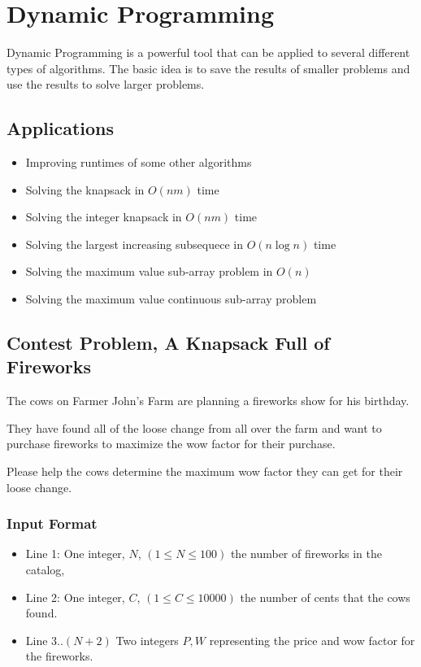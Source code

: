 \section{Dynamic Programming}
Dynamic Programming is a powerful tool that can be applied to several different types of algorithms.\cite{dppractice}
The basic idea is to save the results of smaller problems and use the results to solve larger problems.

\subsection{Applications}
\begin{itemize}
	\item	Improving runtimes of some other algorithms
	\item	Solving the knapsack in $O(nm)$ time
	\item	Solving the integer knapsack in $O(nm)$ time
	\item	Solving the largest increasing subsequece in $O(n \log n)$ time
	\item	Solving the maximum value sub-array problem in $O(n)$
	\item	Solving the maximum value continuous sub-array problem
\end{itemize}

\subsection{Contest Problem, A Knapsack Full of Fireworks}
The cows on Farmer John's Farm are planning a fireworks show for his birthday.

They have found all of the loose change from all over the farm and want to purchase fireworks to maximize the wow factor for their purchase.

Please help the cows determine the maximum wow factor they can get for their loose change.

\subsubsection{Input Format}
\begin{itemize}
	\item Line 1: One integer, $N$, $(1 \leq N \leq 100)$ the number of fireworks in the catalog,
	\item Line 2: One integer, $C$, $(1 \leq C \leq 10000)$ the number of cents that the cows found.
	\item Line 3..$(N+2)$ Two integers $P,W$ representing the price and wow factor for the fireworks.
\end{itemize}

